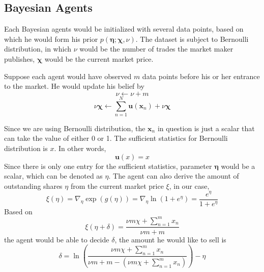 \documentclass[12pt]{article}
\begin{document}
\subsection{Bayesian Agents}\label{Bayesian-agents}
Each Bayesian agents would be initialized with several data points, based on which he would form his prior $p(\boldsymbol{\eta}; \boldsymbol{\chi}, \nu)$. The dataset is subject to Bernoulli distribution, %
 in which $\nu$ would be the number of trades the market maker publishes, $\boldsymbol{\chi}$ would be the current market price.

Suppose each agent would have observed $m$ data points before his or her entrance to the market. He would update his belief by %
$$\nu\leftarrow\nu+m$$ $$\nu\bm{\chi} \leftarrow \sum_{n=1}^{N} \mathbf{u}\left(\mathbf{x}_{n}\right)+\nu \bm{\chi}$$

Since we are using Bernoulli distribution, the $\mathbf{x}_n$ in question is just a scalar that can take the value of either 0 or 1. The sufficient statistics for Bernoulli distribution is $x$. In other words,
\begin{displaymath}
\mathbf{u}(x) = x
\end{displaymath}
Since there is only one entry for the sufficient statistics, parameter $\boldsymbol{\eta}$ would be a scalar, which can be denoted as $\eta$. 
The agent can also derive the amount of outstanding shares $\eta$ from the current market price $\xi$, in our case, 
\begin{equation}
    \xi(\eta) = \nabla_{\eta}\exp{(g(\eta))}=\nabla_{\eta}\ln \left(1+e^{\eta}\right)=\frac{e^{\eta}}{1+e^{\eta}}
\end{equation}
Based on %
$$\xi(\eta+\delta)=\frac{\nu m \chi+\sum_{n=1}^{m}x_n}{\nu m+m}$$ the agent would be able to decide $\delta$, the amount he would like to sell is
$$
    \delta=\ln{(\frac{\nu m \chi+\sum_{n=1}^{m}x_n}{\nu m+m-(\nu m \chi+\sum_{n=1}^{m}x_n)})}-\eta
$$


\end{document}

